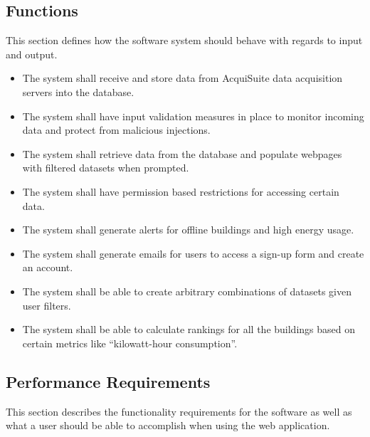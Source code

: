 \documentclass[onecolumn, draftclsnofoot,10pt, compsoc]{IEEEtran}
\begin{document}
\begin{enumerate}
    \subsection{Functions}
    This section defines how the software system should behave with regards to input and output.
    \begin{itemize}
    \item The system shall receive and store data from AcquiSuite data acquisition servers into the database. 
    \item The system shall have input validation measures in place to monitor incoming data and protect from malicious injections.
    \item The system shall retrieve data from the database and populate webpages with filtered datasets when prompted.
    \item The system shall have permission based restrictions for accessing certain data.
    \item The system shall generate alerts for offline buildings and high energy usage.
    \item The system shall generate emails for users to access a sign-up form and create an account.
    \item The system shall be able to create arbitrary combinations of datasets given user filters.
    \item The system shall be able to calculate rankings for all the buildings based on certain metrics like ``kilowatt-hour consumption''.
    \end{itemize}

    \subsection{Performance Requirements}
    This section describes the functionality requirements for the software as well as what a user should be able to accomplish when using the web application.


\end{enumerate}
\end{document}
